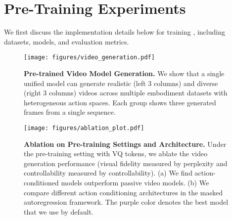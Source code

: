 

\section{Pre-Training Experiments\label{sec:experiment}}

We first discuss the implementation details below for training \ourshort, including datasets, models, and evaluation metrics.
\begin{figure*}[t]
\centering
\texttt{[image: figures/video\_generation.pdf]}
\caption{\label{fig:video_results}\textbf{Pre-trained Video Model Generation.} We show that a single unified \ourshort model can generate realistic (left 3 columns) and diverse (right 3 columns) videos across multiple embodiment datasets with heterogeneous action spaces. Each group shows three generated frames from a single sequence.}
\end{figure*}

\begin{figure}
    \centering    \texttt{[image: figures/ablation\_plot.pdf]}
    \caption{\textbf{Ablation on Pre-training Settings and  Architecture.} Under the pre-training setting with VQ tokens, we ablate the video generation performance (visual fidelity measured by perplexity and controllability measured by controllability). (a) We find action-conditioned models outperform passive video models. (b) We compare different action conditioning architectures in the masked autoregression framework. The purple color denotes the best model that we use by default. }
    \label{fig:pretrain_ablation}
\end{figure}


